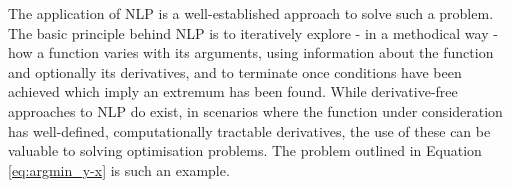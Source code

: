 The application of \ac{NLP} is a well-established approach to solve such a
problem\cite{Fletcher1987,Nocedal2006}. The basic principle behind \ac{NLP} is
to iteratively explore - in a methodical way - how a function varies with its
arguments, using information about the function and optionally its
derivatives, and to terminate once conditions have been achieved which imply an
extremum has been found. While derivative-free approaches to \ac{NLP} do
exist, in
scenarios where the function under consideration has well-defined,
computationally tractable derivatives, the use of these can be valuable to
solving optimisation problems. The problem outlined in Equation
\ref{eq:argmin_y-x} is such an example.


